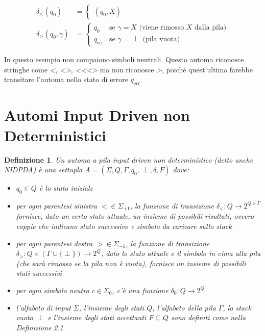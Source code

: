 \documentclass[a4paper,12pt]{report}
\newtheorem{definition}{Definizione}[chapter]
\begin{document}
    \begin{align}
        \delta_{<}(q_0) &= \begin{cases}
        (q_0, X)
        \end{cases} \\[1em]
        \delta_{>}(q_0, \gamma) &= \begin{cases}
            q_0 & \text{se } \gamma = X \text{ (viene rimosso } X \text{ dalla pila)} \\
            q_{\text{err}} & \text{se } \gamma = \perp \text{ (pila vuota)}
        \end{cases}
    \end{align}

    In questo esempio non compaiono simboli neutrali.
    Questo automa riconosce stringhe come \textit{<}, \textit{<>}, \textit{<{<}<>} ma non riconosce \textit{>}, poiché quest'ultima farebbe transitare l'automa nello stato di errore $q_{\text{err}}$.

    \section{Automi Input Driven non Deterministici}

    \begin{definition}
        Un \textit{automa a pila input driven non deterministico} (detto anche NIDPDA) è una settupla $A = (\Sigma, Q, \Gamma, q_0, \perp, \delta, F)$ dove:
        \begin{itemize}
            \item $q_{0} \in Q$ è lo stato iniziale
            \item per ogni parentesi sinistra $< \in \Sigma_{+1}$, la funzione di transizione $\delta_{<} : Q \rightarrow 2^{Q \times \Gamma}$ fornisce, dato un certo stato attuale, un insieme di possibili risultati, ovvero coppie che indicano stato successivo e simbolo da caricare sullo stack
            \item per ogni parentesi destra $> \in \Sigma_{-1}$, la funzione di transizione $\delta_{>} : Q \times (\Gamma \cup \{\perp\}) \rightarrow 2^Q$, dato lo stato attuale e il simbolo in cima alla pila (che sarà rimosso se la pila non è vuota), fornisce un insieme di possibili stati successivi %
            \item per ogni simbolo neutro $c \in \Sigma_{0}$, c'è una funzione $\delta_{0} : Q \rightarrow 2^Q$
            \item l'alfabeto di input $\Sigma$, l'insieme degli stati $Q$, l'alfabeto della pila $\Gamma$, lo stack vuoto $\perp$ e l'insieme degli stati accettanti $F \subseteq Q$ sono definiti come nella Definizione 2.1
        \end{itemize}
    \end{definition}
\end{document}
